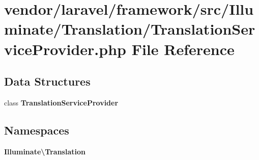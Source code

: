 \section{vendor/laravel/framework/src/\+Illuminate/\+Translation/\+Translation\+Service\+Provider.php File Reference}
\label{_translation_service_provider_8php}
\subsection*{Data Structures}
\begin{DoxyCompactItemize}
\item 
class {\bf Translation\+Service\+Provider}
\end{DoxyCompactItemize}
\subsection*{Namespaces}
\begin{DoxyCompactItemize}
\item 
 {\bf Illuminate\textbackslash{}\+Translation}
\end{DoxyCompactItemize}
